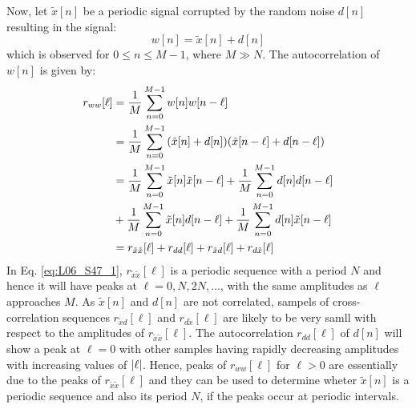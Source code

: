 \documentclass[../../main/main.tex]{subfiles}
\begin{document}
Now, let \( \tilde{x}[n] \) be a periodic signal corrupted by the random noise \( d[n] \) resulting in the signal:
\begin{equation}
    w[n]
    =
    \tilde{x}[n] + d[n]
    \label{eq:L06_S46_1}
\end{equation}
which is observed for \( 0 \le n \le M-1 \), where \( M \gg N \). The autocorrelation of \( w[n] \) is given by:
\begin{align}
    r_{ww}[\ell]
    &=
        \frac{1}{M} \sum_{n=0}^{M-1} w[n]w[n-\ell]  \nonumber   \\
    &=
        \frac{1}{M} \sum_{n=0}^{M-1} \qty(\tilde{x}[n] + d[n]) \qty(\tilde{x}[n-\ell] + d[n-\ell])  \nonumber   \\
    &=
        \frac{1}{M} \sum_{n=0}^{M-1} \tilde{x}[n]\tilde{x}[n-\ell] +
        \frac{1}{M} \sum_{n=0}^{M-1} d[n]d[n-\ell]  \nonumber    \\
    &+
        \frac{1}{M} \sum_{n=0}^{M-1} \tilde{x}[n]d[n-\ell] +
        \frac{1}{M} \sum_{n=0}^{M-1} d[n]\tilde{x}[n-\ell]  \nonumber   \\
    &=
        r_{\tilde{x}\tilde{x}}[\ell] +
        r_{dd}[\ell] +
        r_{\tilde{x}d}[\ell] +
        r_{d\tilde{x}}[\ell]
    \label{eq:L06_S47_1}
\end{align}
In Eq. \ref{eq:L06_S47_1}, \( r_{\tilde{x}\tilde{x}}[\ell] \) is a periodic sequence with a period \( N \) and hence it will have peaks at \( \ell = 0, N, 2N, \dots \), with the same amplitudes as \( \ell \) approaches \( M \).
As \( \tilde{x}[n] \) and \( d[n] \) are not correlated, sampels of cross-correlation sequences \( r_{\tilde{x}d}[\ell] \) and \( r_{d\tilde{x}}[\ell] \) are likely to be very samll with respect to the amplitudes of \( r_{\tilde{x}\tilde{x}}[\ell] \).
The autocorrelation \( r_{dd}[\ell] \) of \( d[n] \) will show a peak at \( \ell = 0 \) with other samples having rapidly decreasing amplitudes with increasing values of \( \abs{\ell}  \).
Hence, peaks of \( r_{ww}[\ell] \) for \( \ell > 0 \) are essentially due to the peaks of \( r_{\tilde{x}\tilde{x}}[\ell] \) and they can be used to determine wheter \( \tilde{x}[n] \) is a periodic sequence and also its period \( N \), if the peaks occur at periodic intervals.
\end{document}
